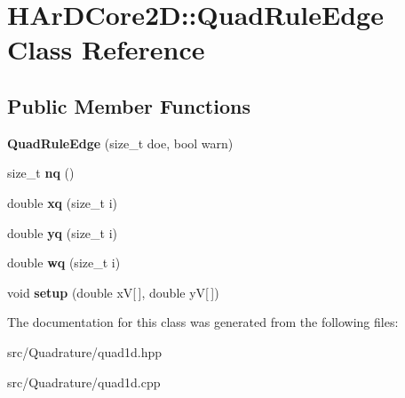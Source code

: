 \hypertarget{classHArDCore2D_1_1QuadRuleEdge}{}\section{H\+Ar\+D\+Core2D\+:\+:Quad\+Rule\+Edge Class Reference}
\label{classHArDCore2D_1_1QuadRuleEdge}
\subsection*{Public Member Functions}
\begin{DoxyCompactItemize}
\item 
\mbox{\label{classHArDCore2D_1_1QuadRuleEdge_abb254b22a706f3781b2b8a7b3fafa288}} 
{\bfseries Quad\+Rule\+Edge} (size\+\_\+t doe, bool warn)
\item 
\mbox{\label{classHArDCore2D_1_1QuadRuleEdge_af245dd9ab99a15742641d81f5508041a}} 
size\+\_\+t {\bfseries nq} ()
\item 
\mbox{\label{classHArDCore2D_1_1QuadRuleEdge_a1b03cf6a6800470a027f570d44338a1f}} 
double {\bfseries xq} (size\+\_\+t i)
\item 
\mbox{\label{classHArDCore2D_1_1QuadRuleEdge_ac272eee335dc95a46787e1a054b38cb7}} 
double {\bfseries yq} (size\+\_\+t i)
\item 
\mbox{\label{classHArDCore2D_1_1QuadRuleEdge_a3fc5a686c8018dbea8ec3a120ad6d9bc}} 
double {\bfseries wq} (size\+\_\+t i)
\item 
\mbox{\label{classHArDCore2D_1_1QuadRuleEdge_a56ca5d37f1c93f74aba256e310392d00}} 
void {\bfseries setup} (double xV\mbox{[}$\,$\mbox{]}, double yV\mbox{[}$\,$\mbox{]})
\end{DoxyCompactItemize}


The documentation for this class was generated from the following files\+:\begin{DoxyCompactItemize}
\item 
src/\+Quadrature/quad1d.\+hpp\item 
src/\+Quadrature/quad1d.\+cpp\end{DoxyCompactItemize}
